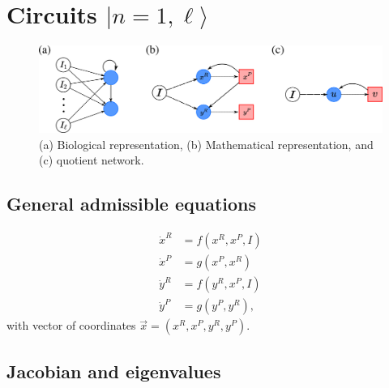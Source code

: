 \documentclass[12pt]{article}
\begin{document}
\section{Circuits $|n=1, \ell \rangle$}

\begin{figure}[H]
    \centering
    \includegraphics[scale=0.5]{figs/n1l_1.png}
    \caption{(a) Biological representation, 
        (b) Mathematical representation, and (c) quotient
        network.}
    \label{fig:fig2}
\end{figure}

\subsection{General admissible equations}

\begin{equation} \label{eq:n1_gen_eq}
    \begin{aligned}
        \dot{x}^R &= f(x^R, x^P, I)\\
        \dot{x}^P &= g(x^P, x^R)\\
        \dot{y}^R &= f(y^R, x^P, I)\\
        \dot{y}^P &= g(y^P, y^R),
    \end{aligned}
\end{equation}
with vector of coordinates $\vec{x} = (x^R, x^P, y^R, y^P)$.

\subsection{Jacobian and eigenvalues}
\end{document}
